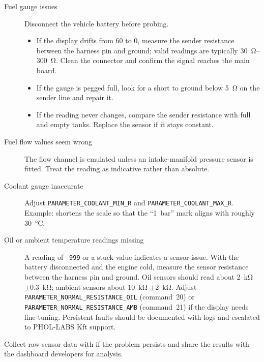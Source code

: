 \begin{description}
    \item[Fuel gauge issues] Disconnect the vehicle battery before probing.\begin{itemize}
        \item If the display drifts from 60 to 0, measure the sender resistance between the harness pin and ground; valid readings are typically \SIrange{30}{300}{\ohm}. Clean the connector and confirm the signal reaches the main board.
        \item If the gauge is pegged full, look for a short to ground below \SI{5}{\ohm} on the sender line and repair it.
        \item If the reading never changes, compare the sender resistance with full and empty tanks. Replace the sensor if it stays constant.
    \end{itemize}
    \item[Fuel flow values seem wrong] The flow channel is emulated unless an intake-manifold pressure sensor is fitted. Treat the reading as indicative rather than absolute.
    \item[Coolant gauge inaccurate] Adjust \texttt{PARAMETER\_COOLANT\_MIN\_R} and \texttt{PARAMETER\_COOLANT\_MAX\_R}. Example:  shortens the scale so that the ``1~bar'' mark aligns with roughly \SI{30}{\celsius}.
    \item[Oil or ambient temperature readings missing] A reading of \texttt{-999} or a stuck value indicates a sensor issue. With the battery disconnected and the engine cold, measure the sensor resistance between the harness pin and ground. Oil sensors should read about \SI{2}{\kilo\ohm} \ensuremath{\pm}\SI{0.3}{\kilo\ohm}; ambient sensors about \SI{10}{\kilo\ohm} \ensuremath{\pm}\SI{2}{\kilo\ohm}. Adjust \texttt{PARAMETER\_NORMAL\_RESISTANCE\_OIL} (command~20) or \texttt{PARAMETER\_NORMAL\_RESISTANCE\_AMB} (command~21) if the display needs fine-tuning. Persistent faults should be documented with  logs and escalated to PHOL-LABS Kft support.
\end{description}

Collect raw sensor data with  if the problem persists and share the results with the dashboard developers for analysis.
